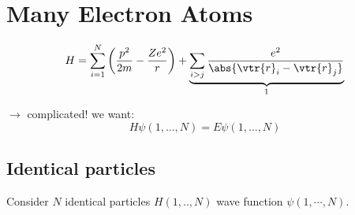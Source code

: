 \chapter{Many Electron Atoms}
%
\begin{dmath}[]
	H=\sum_{i=1}^{N}\left( \frac{p^2}{2m}-\frac{Ze^2}{r} \right)+\underbrace{\sum_{i>j}^{}\frac{e^2}{\abs{\vtr{r}_i-\vtr{r}_j}}}_{\footnotemark}
\end{dmath}
 $\to$ complicated! we want:
\begin{dmath}[]
	H\psi\left( 1,\ldots,N \right)=E\psi\left( 1,\ldots,N \right)
\end{dmath}
\section{Identical particles}
Consider $N$ identical particles $H\left( 1,..,N \right)$ wave function $\psi\left( 1,\cdots,N \right)$.

